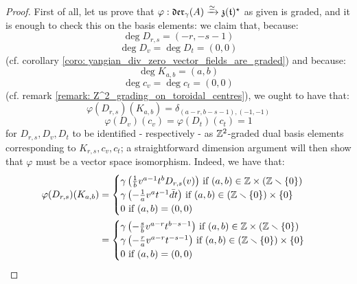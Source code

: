             \begin{proof}
                First of all, let us prove that $\varphi: \divzero \xrightarrow[]{\cong} \z(\toroidal)^{\star}$ as given is graded, and it is enough to check this on the basis elements: we claim that, because:
                    $$\deg D_{r, s} = (-r, -s - 1)$$
                    $$\deg D_v = \deg D_t = (0, 0)$$
                (cf. corollary \ref{coro: yangian_div_zero_vector_fields_are_graded}) and because:
                    $$\deg K_{a, b} = (a, b)$$
                    $$\deg c_v = \deg c_t = (0, 0)$$
                (cf. remark \ref{remark: Z^2_grading_on_toroidal_centres}), we ought to have that:
                    $$\varphi(D_{r, s})(K_{a, b}) = \delta_{(a - r, b - s - 1), (-1, -1)}$$
                    $$\varphi(D_v)(c_v) = \varphi(D_t)(c_t) = 1$$
                for $D_{r, s}, D_v, D_t$ to be identified - respectively - as $\Z^2$-graded dual basis elements corresponding to $K_{r, s}, c_v, c_t$; a straightforward dimension argument will then show that $\varphi$ must be a vector space isomorphism. Indeed, we have that:
                    $$
                        \begin{aligned}
                            \varphi(D_{r, s})(K_{a, b}) & = 
                            \begin{cases}
                                \text{$\gamma\left( \frac1b v^{a - 1} t^b D_{r, s}(v) \right)$ if $(a, b) \in \Z \x (\Z \setminus \{0\})$}
                                \\
                                \text{$\gamma\left( -\frac1a v^a t^{-1} \bar{d}t \right)$ if $(a, b) \in (\Z \setminus \{0\}) \x \{0\}$}
                                \\
                                \text{$0$ if $(a, b) = (0, 0)$}
                            \end{cases}
                            \\
                            & = 
                            \begin{cases}
                                \text{$\gamma\left( -\frac{s}{b} v^{a - r} t^{b - s - 1} \right)$ if $(a, b) \in \Z \x (\Z \setminus \{0\})$}
                                \\
                                \text{$\gamma\left( -\frac{r}{a} v^{a - r} t^{-s - 1} \right)$ if $(a, b) \in (\Z \setminus \{0\}) \x \{0\}$}
                                \\
                                \text{$0$ if $(a, b) = (0, 0)$}

\end{cases}
\end{aligned}$$
\end{proof}
